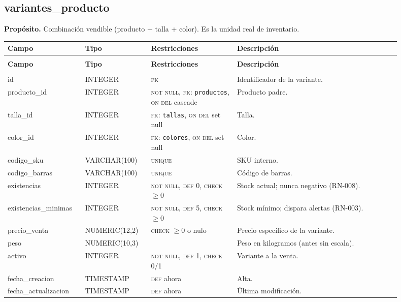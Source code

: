 \documentclass[11pt]{article}
\makeatletter
\newenvironment{campos}{%
  \par\footnotesize
  \setlength{\LTpre}{0.3ex}\setlength{\LTpost}{0.6ex}
  \begin{longtable}{@{}>{\ttfamily}p{0.165\linewidth} >{\ttfamily}p{0.150\linewidth} p{0.205\linewidth} >{\raggedright\arraybackslash}p{0.385\linewidth}@{}}
  \toprule
  \normalfont\bfseries Campo & \normalfont\bfseries Tipo & \normalfont\bfseries Restricciones & \normalfont\bfseries Descripción \\
  \midrule \endfirsthead
  \multicolumn{4}{@{}l}{\footnotesize\itshape \dots\ continuación}\\[0.3ex]
  \toprule
  \normalfont\bfseries Campo & \normalfont\bfseries Tipo & \normalfont\bfseries Restricciones & \normalfont\bfseries Descripción \\
  \midrule \endhead
  \midrule \multicolumn{4}{r@{}}{\footnotesize\itshape continúa en la siguiente página}\\ \endfoot
  \bottomrule \endlastfoot
}{%
  \end{longtable}\par
}
\newcommand{\proposito}[1]{\par\vspace{0.2ex}\noindent\colorbox{brandlight}{\parbox{\dimexpr\linewidth-2\fboxsep}{\small\textbf{Propósito.} #1}}\par\vspace{0.8ex}}
\newcommand{\pk}{\textsc{pk}}
\newcommand{\fk}[1]{\textsc{fk}: \texttt{#1}}
\newcommand{\nn}{\textsc{not null}}
\newcommand{\uq}{\textsc{unique}}
\makeatother
\begin{document}
\subsection{variantes\_producto}
\proposito{Combinación vendible (producto + talla + color). Es la unidad real de inventario.}
\begin{campos}
id                   & INTEGER       & \pk{}   & Identificador de la variante. \\
producto\_id         & INTEGER       & \nn, \fk{productos}, \textsc{on del} cascade & Producto padre. \\
talla\_id            & INTEGER       & \fk{tallas}, \textsc{on del} set null & Talla. \\
color\_id            & INTEGER       & \fk{colores}, \textsc{on del} set null & Color. \\
codigo\_sku          & VARCHAR(100)  & \uq     & SKU interno. \\
codigo\_barras       & VARCHAR(100)  & \uq     & Código de barras. \\
existencias          & INTEGER       & \nn, \textsc{def} 0, \textsc{check} $\geq 0$ & Stock actual; nunca negativo (RN-008). \\
existencias\_minimas & INTEGER       & \nn, \textsc{def} 5, \textsc{check} $\geq 0$ & Stock mínimo; dispara alertas (RN-003). \\
precio\_venta        & NUMERIC(12,2) & \textsc{check} $\geq 0$ o nulo & Precio específico de la variante. \\
peso                 & NUMERIC(10,3) &         & Peso en kilogramos (antes sin escala). \\
activo               & INTEGER       & \nn, \textsc{def} 1, \textsc{check} 0/1 & Variante a la venta. \\
fecha\_creacion      & TIMESTAMP     & \textsc{def} ahora & Alta. \\
fecha\_actualizacion & TIMESTAMP     & \textsc{def} ahora & Última modificación. \\
\end{campos}
\end{document}
